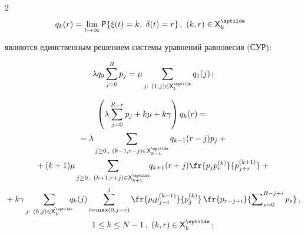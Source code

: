 \begin{multicols}{2}
\begin{align}
 q_k(r) &= \lim\limits_{t\to\infty} {\sf P}\{\xi(t)=k, \ \delta(t)=r\}\,,\ (k,r)\in {\sf 

X}_k^{\sptilde}\!\!

  \label{e6-sop}

  \end{align}

являются единственным решением системы уравнений равновесия (СУР):



\noindent

\begin{equation*}

\lambda q_0\sum\limits^R_{j=0} p_j =\mu \sum\limits_{j:\ (1,j)\in {\sf 

X}_1^{\sptilde}} q_1(j)\,;


\end{equation*}



\vspace*{-12pt}



\noindent

\begin{multline*}

\left( \lambda\sum\limits_{j=0}^{R-r} p_j +k\mu +k\gamma\right) q_k(r) 

={}\\

{}=\lambda \sum\limits_{j\geq 0\,,\ (k-1,r-j)\in {\sf X}^{\sptilde}_{k-1}} q_{k-1}(r-j) 

p_j+{}\\

{}+ (k+1) \mu \sum\limits_{j\geq0\,,\ (k+1, r+j)\in {\sf X}_{k+1}^{\sptilde}} \hspace*{-1mm}

q_{k+1}(r+j)\fr{p_j p_r^{(k)}}{p_{j+r}^{(k+1)}}+{}\\

{}+k\gamma \sum\limits_{j:\ (k,j)\in {\sf X}_k^{\sptilde}}\hspace*{-6pt} q_k(j) 

\sum\limits^j_{i=\max(0,j-r)} \fr{p_i p_{j-i}^{(k-1)}}{p_j^{(k)}}\, 

\fr{p_{r-j+i}} 

{\sum\nolimits_{s=0}^{R-j+i} p_s}\,,\\ 1\leq k\leq N-1\,,\ (k,r)\in {\sf 

X}_k^{\sptilde}\,;



\end{multline*}
\end{multicols}

